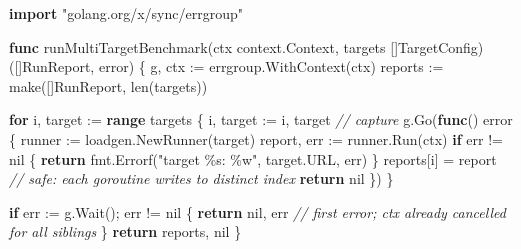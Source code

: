 \documentclass[
]{article}
\newenvironment{Shaded}{}{}
\newcommand{\BuiltInTok}[1]{\textcolor[rgb]{0.00,0.50,0.00}{#1}}
\newcommand{\CommentTok}[1]{\textcolor[rgb]{0.38,0.63,0.69}{\textit{#1}}}
\newcommand{\ControlFlowTok}[1]{\textcolor[rgb]{0.00,0.44,0.13}{\textbf{#1}}}
\newcommand{\DataTypeTok}[1]{\textcolor[rgb]{0.56,0.13,0.00}{#1}}
\newcommand{\KeywordTok}[1]{\textcolor[rgb]{0.00,0.44,0.13}{\textbf{#1}}}
\newcommand{\NormalTok}[1]{#1}
\newcommand{\OperatorTok}[1]{\textcolor[rgb]{0.40,0.40,0.40}{#1}}
\newcommand{\OtherTok}[1]{\textcolor[rgb]{0.00,0.44,0.13}{#1}}
\newcommand{\StringTok}[1]{\textcolor[rgb]{0.25,0.44,0.63}{#1}}
\begin{document}
\begin{Shaded}
\begin{Highlighting}[]
\KeywordTok{import} \StringTok{"golang.org/x/sync/errgroup"}

\KeywordTok{func}\NormalTok{ runMultiTargetBenchmark}\OperatorTok{(}\NormalTok{ctx context}\OperatorTok{.}\NormalTok{Context}\OperatorTok{,}\NormalTok{ targets }\OperatorTok{[]}\NormalTok{TargetConfig}\OperatorTok{)} \OperatorTok{([]}\NormalTok{RunReport}\OperatorTok{,} \DataTypeTok{error}\OperatorTok{)} \OperatorTok{\{}
\NormalTok{    g}\OperatorTok{,}\NormalTok{ ctx }\OperatorTok{:=}\NormalTok{ errgroup}\OperatorTok{.}\NormalTok{WithContext}\OperatorTok{(}\NormalTok{ctx}\OperatorTok{)}
\NormalTok{    reports }\OperatorTok{:=} \BuiltInTok{make}\OperatorTok{([]}\NormalTok{RunReport}\OperatorTok{,} \BuiltInTok{len}\OperatorTok{(}\NormalTok{targets}\OperatorTok{))}

    \ControlFlowTok{for}\NormalTok{ i}\OperatorTok{,}\NormalTok{ target }\OperatorTok{:=} \KeywordTok{range}\NormalTok{ targets }\OperatorTok{\{}
\NormalTok{        i}\OperatorTok{,}\NormalTok{ target }\OperatorTok{:=}\NormalTok{ i}\OperatorTok{,}\NormalTok{ target }\CommentTok{// capture}
\NormalTok{        g}\OperatorTok{.}\NormalTok{Go}\OperatorTok{(}\KeywordTok{func}\OperatorTok{()} \DataTypeTok{error} \OperatorTok{\{}
\NormalTok{            runner }\OperatorTok{:=}\NormalTok{ loadgen}\OperatorTok{.}\NormalTok{NewRunner}\OperatorTok{(}\NormalTok{target}\OperatorTok{)}
\NormalTok{            report}\OperatorTok{,}\NormalTok{ err }\OperatorTok{:=}\NormalTok{ runner}\OperatorTok{.}\NormalTok{Run}\OperatorTok{(}\NormalTok{ctx}\OperatorTok{)}
            \ControlFlowTok{if}\NormalTok{ err }\OperatorTok{!=} \OtherTok{nil} \OperatorTok{\{}
                \ControlFlowTok{return}\NormalTok{ fmt}\OperatorTok{.}\NormalTok{Errorf}\OperatorTok{(}\StringTok{"target \%s: \%w"}\OperatorTok{,}\NormalTok{ target}\OperatorTok{.}\NormalTok{URL}\OperatorTok{,}\NormalTok{ err}\OperatorTok{)}
            \OperatorTok{\}}
\NormalTok{            reports}\OperatorTok{[}\NormalTok{i}\OperatorTok{]} \OperatorTok{=}\NormalTok{ report }\CommentTok{// safe: each goroutine writes to distinct index}
            \ControlFlowTok{return} \OtherTok{nil}
        \OperatorTok{\})}
    \OperatorTok{\}}

    \ControlFlowTok{if}\NormalTok{ err }\OperatorTok{:=}\NormalTok{ g}\OperatorTok{.}\NormalTok{Wait}\OperatorTok{();}\NormalTok{ err }\OperatorTok{!=} \OtherTok{nil} \OperatorTok{\{}
        \ControlFlowTok{return} \OtherTok{nil}\OperatorTok{,}\NormalTok{ err }\CommentTok{// first error; ctx already cancelled for all siblings}
    \OperatorTok{\}}
    \ControlFlowTok{return}\NormalTok{ reports}\OperatorTok{,} \OtherTok{nil}
\OperatorTok{\}}
\end{Highlighting}
\end{Shaded}
\end{document}
